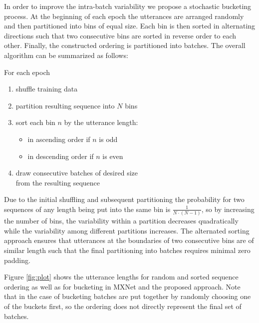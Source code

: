 \documentclass{article}
\begin{document}
  In order to improve the intra-batch variability we propose a stochastic bucketing process. At the beginning
  of each epoch the utterances are arranged randomly and then partitioned into bins of equal size. Each bin
  is then sorted in alternating directions such that two consecutive bins are sorted in reverse order to each 
  other. Finally, the constructed ordering is partitioned into batches. The overall algorithm can be summarized as follows: \\[1ex]
 
 \begin{minipage}{\textwidth}
 	\vspace{-4mm}
 	For each epoch
 	\begin{enumerate}
 		\item shuffle training data %
 		\item partition resulting sequence into $N$ bins
 		\item sort each bin $n$ by the utterance length:
 		\begin{itemize}
 			\item in ascending order if $n$ is odd
 			\item in descending order if $n$ is even
 		\end{itemize}
 		\item draw consecutive batches of desired size \\
 		from the resulting sequence \\[1ex]
 	\end{enumerate}
 \end{minipage}

 Due to the initial shuffling and subsequent partitioning the probability for two sequences of any length being 
 put into the same bin is $\frac{1}{N\cdot(N-1)}$, so by increasing the number of bins, the variability within a 
 partition decreases quadratically while the variability among different partitions increases. The alternated
 sorting approach ensures that utterances at the boundaries of two consecutive bins are of similar length such 
 that the final partitioning into batches requires minimal zero padding.
 
 Figure \ref{fig:plot} shows the utterance lengths for random and sorted sequence ordering as well as for bucketing in MXNet and the proposed approach. Note that in the case of bucketing batches are put
 together by randomly choosing one of the buckets first, so the ordering does not directly represent 
 the final set of batches.
\end{document}
